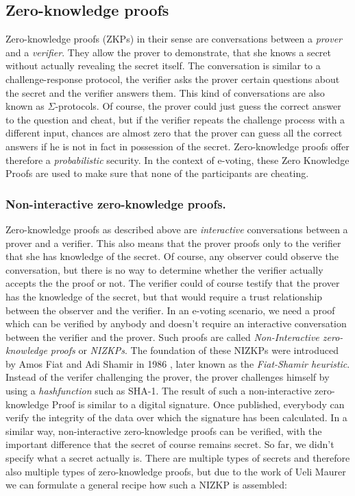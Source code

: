 \documentclass[numbers=noenddot, abstract=on, a4paper, headsepline,
footsepline, oneside, draft=off]{scrreprt}
\begin{document}
\subsection{Zero-knowledge proofs}
\label{sec:zeroknowledgeproofs}
Zero-knowledge proofs (ZKPs) in their sense are conversations between a
\textit{prover} and a \textit{verifier}. They allow the prover to demonstrate,
that she knows a secret without actually revealing the secret itself. The
conversation is similar to a challenge-response protocol, the verifier asks the
prover certain questions about the secret and the verifier answers them. This
kind of conversations are also known as $\Sigma$-protocols. Of course, the
prover could just guess the correct answer to the question and cheat, but if the
verifier repeats the challenge process with a different input, chances are
almost zero that the prover can guess all the correct answers if he is not in
fact in possession of the secret. Zero-knowledge proofs offer therefore a
\textit{probabilistic} security. In the context of e-voting, these Zero
Knowledge Proofs are used to make sure that none of the participants are
cheating.

\subsubsection{Non-interactive zero-knowledge proofs.}
Zero-knowledge proofs as described above are \textit{interactive} conversations
between a prover and a verifier. This also means that the prover proofs only to
the verifier that she has knowledge of the secret. Of course, any observer could
observe the conversation, but there is no way to determine whether the verifier
actually accepts the the proof or not. The verifier could of course testify that
the prover has the knowledge of the secret, but that would require a trust
relationship between the observer and the verifier. In an e-voting scenario, we
need a proof which can be verified by anybody and doesn't require an interactive
conversation between the verifier and the prover. Such proofs are called
\textit{Non-Interactive zero-knowledge proofs} or \textit{NIZKPs}. The
foundation of these NIZKPs were introduced by Amos Fiat and Adi Shamir in 1986
\cite{FS87}, later known as the \textit{Fiat-Shamir heuristic}. Instead of the
verifer challenging the prover, the prover challenges himself by using a
\textit{hashfunction} such as SHA-1. The result of such a non-interactive
zero-knowledge Proof is similar to a digital signature. Once published,
everybody can verify the integrity of the data over which the signature has been
calculated. In a similar way, non-interactive zero-knowledge proofs can be
verified, with the important difference that the secret of course remains
secret. So far, we didn't specify what a secret actually is. There are multiple
types of secrets and therefore also multiple types of zero-knowledge proofs, but
due to the work of Ueli Maurer \cite{Maurer09} we can formulate a general
recipe how such a NIZKP is assembled:
\end{document}
